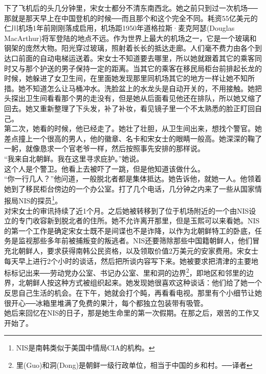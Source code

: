 下了飞机后的头几分钟里，宋女士都分不清东南西北。她之前只到过一次机场──那就是那天早上在中国登机的时候──而且那个和这个完全不同。耗资55亿美元的仁川机场1年前刚刚落成启用，机场距1950年道格拉斯·麦克阿瑟(Douglas MacArthur)将军登陆的地点不远。作为世界上最大的机场之一，它是一个玻璃和钢架的庞然大物。阳光穿过玻璃，照射着长长的抵达走廊。人们毫不费力由各个到达口前面的自动电梯运送着。宋女士不知道要去哪里，所以她就跟着其它的乘客同时又与那个护送的男子保持一定的距离。当其它的乘客在移民局柜台前排起长龙的时候，她躲进了女卫生间，在里面她发现那里同机场其它的地方一样让她不知所措。她不知道怎么让马桶冲水。洗脸盆上的水龙头是自动开关的，不用接触。她把头探出卫生间看看那个男的走没有，但是她从后面看见他还在排队，所以她又缩了回去。她又重新整理了下头发，补了补妆，看见镜子里一个不太熟悉的脸正盯回自己。\\

第二次，她看的时候，他已经走了。她壮了壮胆，从卫生间出来，想找个警官。她差点撞上一个很高的男人，他的徽章、名卡和宋女士的眼睛一般高。她深深的鞠了一躬，就像恳求一个官老爷一样，然后按照事先安排的那样说。\\

“我来自北朝鲜。我在这里寻求庇护。”她说。\\

这个人是个警卫。他看上去被吓了一跳，但是他知道该做什么。\\

“你一行几人？”他问道，一般脱北者都是集体抵达。她告诉他，就她一人。他领着她到了移民柜台傍边的一个办公室。打了几个电话，几分钟之内来了一些从国家情报局NIS的探员\footnote{NIS是南韩类似于美国中情局CIA的机构。}。\\

对宋女士的审讯持续了近1个月。之后她被转移到了位于机场附近的一个由NIS设立的专门收容新到脱北者的住所。她不允许离开那里，但是玉熙可以来看她。NIS的第一个工作是确定宋女士既不是间谍也不是诈降，以作为北朝鲜特工的卧底，任务是监视那些多年前被捕叛变的叛逃者。NIS还要筛除那些中国籍朝鲜人，他们冒充北朝鲜人，要求获得南韩公民资格，以及领取价值2万美元的安家费用。宋女士每天早上进行2个小时的谈话，然后把所谈内容写下来。她被要求把清津的主要地标标记出来──劳动党办公室、书记办公室、里和洞的边界\footnote{里(Guo)和洞(Dong)是朝鲜一级行政单位，相当于中国的乡和村。──译者}，即地区和邻里的边界，北朝鲜人按这种方式被组织起来。她发现她很喜欢这种谈话：他们给了她一个反思自己生活的机会。在下午，她就会打个盹，再看看电视。那里有个小细节让她很开心──冰箱里堆满了免费的果汁，每个都独立包装带有吸管。\\

她后来回忆在NIS的日子，那是她生命里的第一次假期。在那之后，艰苦的工作又开始了。\\

